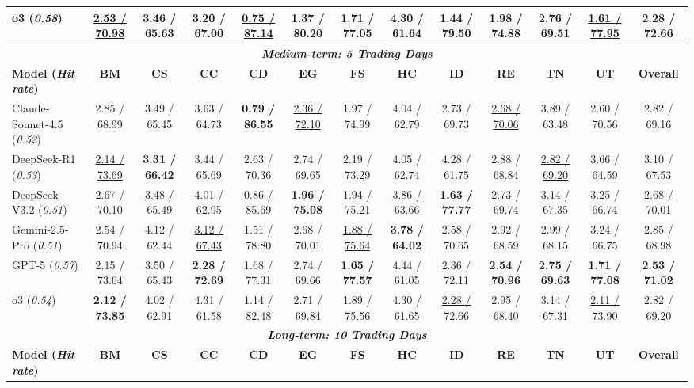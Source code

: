 \documentclass[conference]{IEEEtran}
\begin{document}
\begin{table}[t]
{\begin{tabular}{l|cccccccccccc}
    o3 ({\it 0.58}) & \underline{2.53 / 70.98} & 3.46 / 65.63 & 3.20 / 67.00 & \underline{0.75 / 87.14} & 1.37 / 80.20 & 1.71 / 77.05 & 4.30 / 61.64 & 1.44 / 79.50 & 1.98 / 74.88 & \textbf{2.76 / 69.51} & \underline{1.61 / 77.95} & 2.28 / 72.66 \\
    \midrule
    \multicolumn{13}{c}{\bf \textit{Medium-term: 5 Trading Days}} \\
    \midrule
    \textbf{Model ({\it Hit rate})} & \textbf{BM} & \textbf{CS} & \textbf{CC} & \textbf{CD} & \textbf{EG} & \textbf{FS} & \textbf{HC} & \textbf{ID} & \textbf{RE} & \textbf{TN} & \textbf{UT} & \textbf{Overall} \\
    \midrule
    Claude-Sonnet-4.5 ({\it 0.52}) & 2.85 / 68.99 & 3.49 / 65.45 & 3.63 / 64.73 & \textbf{0.79 / 86.55} & \underline{2.36 / 72.10} & 1.97 / 74.99 & 4.04 / 62.79 & 2.73 / 69.73 & \underline{2.68 / 70.06} & 3.89 / 63.48 & 2.60 / 70.56 & 2.82 / 69.16 \\
    DeepSeek-R1 ({\it 0.53}) & \underline{2.14 / 73.69} & \textbf{3.31 / 66.42} & 3.44 / 65.69 & 2.63 / 70.36 & 2.74 / 69.65 & 2.19 / 73.29 & 4.05 / 62.74 & 4.28 / 61.75 & 2.88 / 68.84 & \underline{2.82 / 69.20} & 3.66 / 64.59 & 3.10 / 67.53 \\
    DeepSeek-V3.2 ({\it 0.51}) & 2.67 / 70.10 & \underline{3.48 / 65.49} & 4.01 / 62.95 & \underline{0.86 / 85.69} & \textbf{1.96 / 75.08} & 1.94 / 75.21 & \underline{3.86 / 63.66} & \textbf{1.63 / 77.77} & 2.73 / 69.74 & 3.14 / 67.35 & 3.25 / 66.74 & \underline{2.68 / 70.01} \\
    Gemini-2.5-Pro ({\it 0.51}) & 2.54 / 70.94 & 4.12 / 62.44 & \underline {3.12 / 67.43} & 1.51 / 78.80 & 2.68 / 70.01 & \underline{1.88 / 75.64} & \textbf{3.78 / 64.02} & 2.58 / 70.65 & 2.92 / 68.59 & 2.99 / 68.15 & 3.24 / 66.75 & 2.85 / 68.98 \\
    GPT-5 ({\it 0.57}) & 2.15 / 73.64 & 3.50 / 65.43 & \textbf{2.28 / 72.69} & 1.68 / 77.31 & 2.74 / 69.66 & \textbf{1.65 / 77.57} & 4.44 / 61.05 & 2.36 / 72.11 & \textbf{2.54 / 70.96} & \textbf{2.75 / 69.63} & \textbf{1.71 / 77.08} & \textbf{2.53 / 71.02} \\
    o3 ({\it 0.54}) & \textbf{2.12 / 73.85} & 4.02 / 62.91 & 4.31 / 61.58 & 1.14 / 82.48 & 2.71 / 69.84 & 1.89 / 75.56 & 4.30 / 61.65 &  \underline{2.28 / 72.66} & 2.95 / 68.40 & 3.14 / 67.31 & \underline{2.11 / 73.90} & 2.82 / 69.20 \\
    \midrule
    \multicolumn{13}{c}{\bf \textit{Long-term: 10 Trading Days}} \\
    \midrule
    \textbf{Model ({\it Hit rate})} & \textbf{BM} & \textbf{CS} & \textbf{CC} & \textbf{CD} & \textbf{EG} & \textbf{FS} & \textbf{HC} & \textbf{ID} & \textbf{RE} & \textbf{TN} & \textbf{UT} & \textbf{Overall} \\

\end{tabular}}
\end{table}
\end{document}
